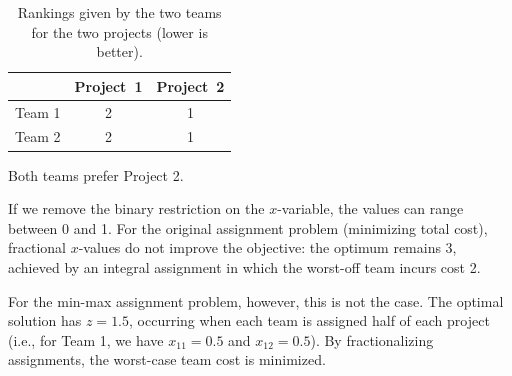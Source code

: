 \begin{table}[h!] 
\begin{center} 
\begin{tabular} {|c||c|c|}
\hline           & Project~1 & Project~2 \\ \hline \hline
Team 1    & 2  & 1  \\
Team 2    & 2  & 1 \\ \hline
\end{tabular} 
\end{center} 
\caption{Rankings given by the two teams for the two projects (lower is better).}\label{tab:modeling-sums-tab04}%
\end{table}

Both teams prefer Project 2.

If we remove the binary restriction on the \(x\)-variable, the values can range between 0 and 1.  
For the original assignment problem (minimizing total cost), fractional \(x\)-values do not improve the objective: the optimum remains 3, achieved by an integral assignment in which the worst-off team incurs cost 2.  

For the min-max assignment problem, however, this is not the case. The optimal solution has \(z=1.5\), occurring when each team is assigned half of each project (i.e., for Team 1, we have \(x_{11} = 0.5\) and \(x_{12} = 0.5\)). By fractionalizing assignments, the worst-case team cost is minimized.

